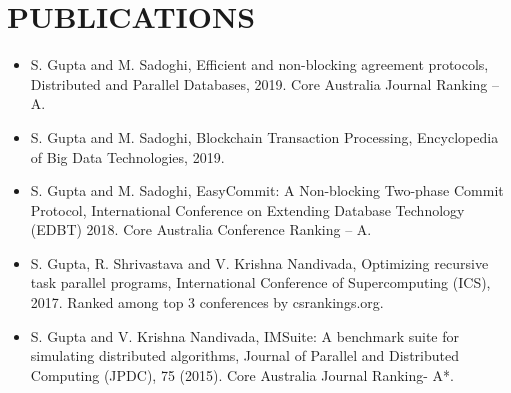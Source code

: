 \documentclass[10pt]{article}
\begin{document}
\section*{PUBLICATIONS}
\begin{itemize}
\itemsep-0.2em

\item S. Gupta and M. Sadoghi, Efficient and non-blocking agreement protocols, Distributed and Parallel Databases, 2019. Core Australia Journal Ranking -- A.

\item S. Gupta and M. Sadoghi, Blockchain Transaction Processing, Encyclopedia of Big Data Technologies, 2019.

\item S. Gupta and M. Sadoghi, EasyCommit: A Non-blocking Two-phase Commit Protocol, International Conference on Extending Database Technology (EDBT) 2018. Core Australia Conference Ranking -- A.

\item S. Gupta, R. Shrivastava and V. Krishna Nandivada, Optimizing recursive task parallel programs, International Conference of Supercomputing (ICS), 2017. Ranked among top 3 conferences by csrankings.org.

\item S. Gupta and V. Krishna Nandivada, IMSuite: A benchmark suite for simulating distributed algorithms, Journal of Parallel and Distributed Computing (JPDC), 75 (2015). Core Australia Journal Ranking- A*.


\end{itemize}
\end{document}
